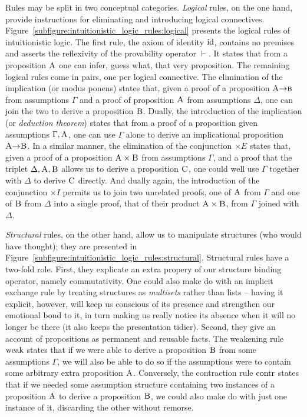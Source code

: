 Rules may be split in two conceptual categories.
\textit{Logical} rules, on the one hand, provide instructions for eliminating and introducing logical connectives.
Figure~\ref{subfigure:intuitionistic_logic_rules:logical} presents the logical rules of intuitionistic logic.
The first rule, the axiom of identity $\mathrm{id}$, contains no premises and asserts the reflexivity of the provability operator $\vdash$. 
It states that from a proposition $\normalfont\textsc{A}$ one can infer, guess what, that very proposition.
The remaining logical rules come in pairs, one per logical connective.
The elimination of the implication (or modus ponens) states that, given a proof of a proposition $\smallprop A \ii \prop{b}$ from assumptions $\Gamma$ and a proof of proposition $\normalfont\textsc{A}$ from assumptions $\Delta$, one can join the two to derive a proposition $\normalfont\textsc{B}$.
Dually, the introduction of the implication (or \textit{deduction theorem}) states that from a proof of a proposition  given assumptions $\Gamma, \normalfont\textsc{A}$, one can use $\Gamma$ alone to derive an implicational proposition $\smallprop A \ii \smallprop B$.
In a similar manner, the elimination of the conjunction $\times E $ states that, given a proof of a proposition $\normalfont\textsc{A} \times \normalfont\textsc{B}$ from assumptions $\Gamma$, and a proof that the triplet $\Delta, \normalfont\textsc{A}, \normalfont\textsc{B}$ allows us to derive a proposition $\normalfont\textsc{C}$, one could well use $\Gamma$ together with $\Delta$ to derive $\prop C$ directly.
And dually again, the introduction of the conjunction $\times I$ permits us to join two unrelated proofs, one of $\normalfont\textsc{A}$ from $\Gamma$ and one of $\normalfont\textsc{B}$ from $\Delta$ into a single proof, that of their product $\normalfont\textsc{A} \times \normalfont\textsc{B}$, from $\Gamma$ joined with $\Delta$.

\textit{Structural} rules, on the other hand, allow us to manipulate structures (who would have thought); they are presented in Figure~\ref{subfigure:intuitionistic_logic_rules:structural}.
Structural rules have a two-fold role.
First, they explicate an extra propery of our structure binding operator, namely commutativity.
One could also make do with an implicit exchange rule by treating structures as \textit{multisets} rather than lists -- having it explicit, however, will keep us conscious of its presence and strengthen our emotional bond to it, in turn making us really notice its absence when it will no longer be there (it also keeps the presentation tidier).
Second, they give an account of propositions as permanent and reusable facts.
The weakening rule $\mathrm{weak}{}$ states that if we were able to derive a proposition $\normalfont\textsc{B}$ from some assumptions $\Gamma$, we will also be able to do so if the assumptions were to contain some arbitrary extra proposition $\normalfont\textsc{A}$.
Conversely, the contraction rule $\mathrm{contr}{}$ states that if we needed some assumption structure containing two instances of a proposition $\normalfont\textsc{A}$ to derive a proposition $\normalfont\textsc{B}$, we could also make do with just one instance of it, discarding the other without remorse.

